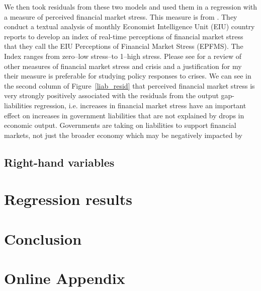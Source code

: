 \documentclass[]{article}
\begin{document}
We then took residuals from these two models and used them in a regression with a measure of perceived financial market stress. This measure is from \cite{gandrudHallEPFMS}. They conduct a textual analysis of monthly Economist Intelligence Unit (EIU) country reports to develop an index of real-time perceptions of financial market stress that they call the EIU Perceptions of Financial Market Stress (EPFMS). The Index ranges from zero--low stress--to 1--high stress. Please see \cite{gandrudHallEPFMS} for a review of other measures of financial market stress and crisis and a justification for my their measure is preferable for studying policy responses to crises. We can see in the second column of Figure~\ref{liab_resid} that perceived financial market stress is very strongly positively associated with the residuals from the output gap-liabilities regression, i.e. increases in financial market stress have an important effect on increases in government liabilities that are not explained by drops in economic output. Governments are taking on liabilities to support financial markets, not just the broader economy which may be negatively impacted by


\subsection*{Right-hand variables}

\section{Regression results}

\section*{Conclusion}







\section{Online Appendix}


\end{document}
